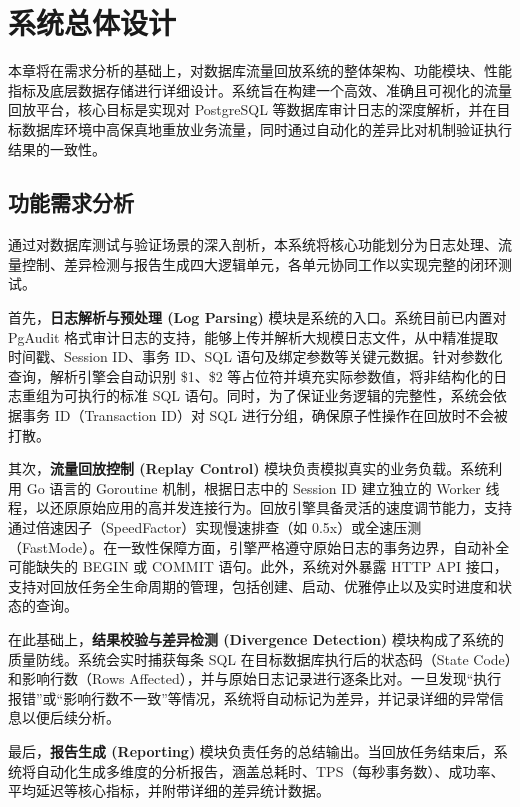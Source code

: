 \newpage
\setcounter{table}{0}
\setcounter{figure}{0}
\section{系统总体设计}

本章将在需求分析的基础上，对数据库流量回放系统的整体架构、功能模块、性能指标及底层数据存储进行详细设计。系统旨在构建一个高效、准确且可视化的流量回放平台，核心目标是实现对 PostgreSQL 等数据库审计日志的深度解析，并在目标数据库环境中高保真地重放业务流量，同时通过自动化的差异比对机制验证执行结果的一致性。

\subsection{功能需求分析}

通过对数据库测试与验证场景的深入剖析，本系统将核心功能划分为日志处理、流量控制、差异检测与报告生成四大逻辑单元，各单元协同工作以实现完整的闭环测试。

首先，\textbf{日志解析与预处理 (Log Parsing)} 模块是系统的入口。系统目前已内置对 PgAudit 格式审计日志的支持，能够上传并解析大规模日志文件，从中精准提取时间戳、Session ID、事务 ID、SQL 语句及绑定参数等关键元数据。针对参数化查询，解析引擎会自动识别 \$1、\$2 等占位符并填充实际参数值，将非结构化的日志重组为可执行的标准 SQL 语句。同时，为了保证业务逻辑的完整性，系统会依据事务 ID（Transaction ID）对 SQL 进行分组，确保原子性操作在回放时不会被打散。

其次，\textbf{流量回放控制 (Replay Control)} 模块负责模拟真实的业务负载。系统利用 Go 语言的 Goroutine 机制，根据日志中的 Session ID 建立独立的 Worker 线程，以还原原始应用的高并发连接行为。回放引擎具备灵活的速度调节能力，支持通过倍速因子（SpeedFactor）实现慢速排查（如 0.5x）或全速压测（FastMode）。在一致性保障方面，引擎严格遵守原始日志的事务边界，自动补全可能缺失的 BEGIN 或 COMMIT 语句。此外，系统对外暴露 HTTP API 接口，支持对回放任务全生命周期的管理，包括创建、启动、优雅停止以及实时进度和状态的查询。

在此基础上，\textbf{结果校验与差异检测 (Divergence Detection)} 模块构成了系统的质量防线。系统会实时捕获每条 SQL 在目标数据库执行后的状态码（State Code）和影响行数（Rows Affected），并与原始日志记录进行逐条比对。一旦发现“执行报错”或“影响行数不一致”等情况，系统将自动标记为差异，并记录详细的异常信息以便后续分析。

最后，\textbf{报告生成 (Reporting)} 模块负责任务的总结输出。当回放任务结束后，系统将自动化生成多维度的分析报告，涵盖总耗时、TPS（每秒事务数）、成功率、平均延迟等核心指标，并附带详细的差异统计数据。

